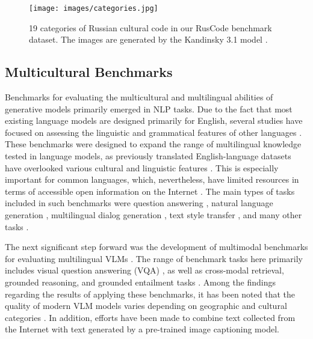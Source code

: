 \begin{figure*}[t]
\texttt{[image: images/categories.jpg]}
  \caption{19 categories of Russian cultural code in our RusCode benchmark dataset. The images are generated by the Kandinsky 3.1 model \cite{arkhipkin2024kandinsky30technicalreport, vladimir-etal-2024-kandinsky}.}
  \label{fig:categories}
\end{figure*}

\subsection{Multicultural Benchmarks}

Benchmarks for evaluating the multicultural and multilingual abilities of generative models primarily emerged in NLP tasks. Due to the fact that most existing language models are designed primarily for English, several studies have focused on assessing the linguistic and grammatical features of other languages \cite{cahyawijaya-etal-2021-indonlg, https://doi.org/10.48550/arxiv.2208.13078, mukherjee-etal-2024-multilingual-text, kim-etal-2024-click, fenogenova-etal-2024-mera, taktasheva2024rublimprussianbenchmarklinguistic}. These benchmarks were designed to expand the range of multilingual knowledge tested in language models, as previously translated English-language datasets have overlooked various cultural and linguistic features \cite{kim-etal-2024-click}. This is especially important for common languages, which, nevertheless, have limited resources in terms of accessible open information on the Internet \cite{cahyawijaya-etal-2021-indonlg, https://doi.org/10.48550/arxiv.2208.13078}. The main types of tasks included in such benchmarks were question answering \cite{kim-etal-2024-click}, natural language generation \cite{cahyawijaya-etal-2021-indonlg}, multilingual dialog generation \cite{https://doi.org/10.48550/arxiv.2208.13078}, text style transfer \cite{mukherjee-etal-2024-multilingual-text}, and many other tasks \cite{fenogenova-etal-2024-mera}.

The next significant step forward was the development of multimodal benchmarks for evaluating multilingual VLMs \cite{NEURIPS2022_6a386d70, pmlr-v162-bugliarello22a, nayak2024benchmarkingvisionlanguagemodels, romero2024cvqaculturallydiversemultilingualvisual, inoue2024heronbench}. The range of benchmark tasks here primarily includes visual question answering (VQA) \cite{pmlr-v162-bugliarello22a, nayak2024benchmarkingvisionlanguagemodels, romero2024cvqaculturallydiversemultilingualvisual, inoue2024heronbench}, as well as cross-modal retrieval, grounded reasoning, and grounded entailment tasks \cite{pmlr-v162-bugliarello22a}. Among the findings regarding the results of applying these benchmarks, it has been noted that the quality of modern VLM models varies depending on geographic and cultural categories \cite{nayak2024benchmarkingvisionlanguagemodels}. In addition, efforts have been made to combine text collected from the Internet with text generated by a pre-trained image captioning model.

